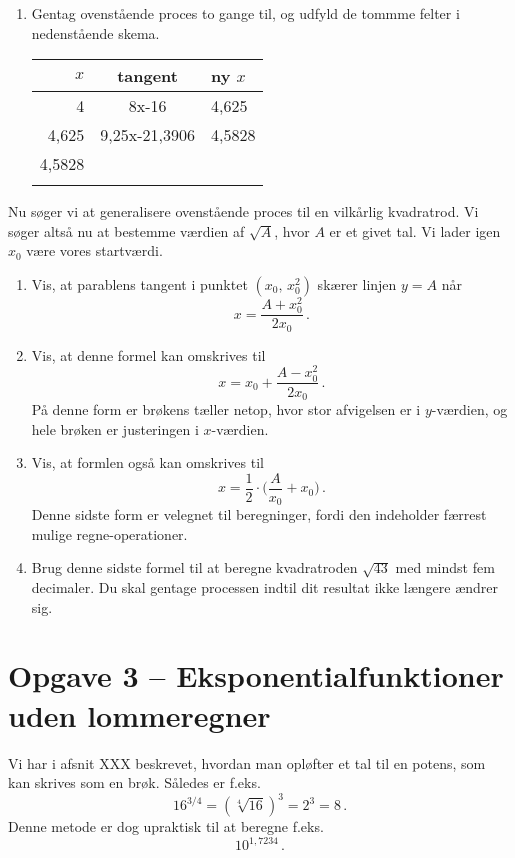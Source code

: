 \documentclass[12pt,oneside,a4paper]{article}
\theoremstyle{plain}
\begin{document}
\begin{enumerate}[label=(\alph*), resume]
    \item Gentag ovenstående proces to gange til, og udfyld de tommme felter i
        nedenstående skema.
        \begin{center}
            \begin{tabular}{|r|c|l|}
\hline
                $x$ & tangent & ny $x$ \\
                \hline
                4 & 8x-16 & 4,625 \\
                \hline
                4,625 & 9,25x-21,3906 & 4,5828 \\
                \hline
                4,5828 & & \\
                \hline
                 & & \\
                \hline
            \end{tabular}
        \end{center}
\end{enumerate}

Nu søger vi at generalisere ovenstående proces til en vilkårlig 
kvadratrod. Vi søger altså nu at bestemme værdien af $\sqrt{A}$, hvor
$A$ er et givet tal. Vi lader igen $x_0$ være vores startværdi.

\begin{enumerate}[label=(\alph*), resume]
    \item Vis, at parablens tangent i punktet $(x_0,\,x_0^2)$ 
        skærer linjen $y=A$ når
        \[
            x = \frac{A+x_0^2}{2x_0}\,.
        \]
    \item Vis, at denne formel kan omskrives til 
        \[
            x = x_0 + \frac{A-x_0^2}{2x_0}\,.
        \]
    På denne form er brøkens tæller netop, hvor stor afvigelsen er i $y$-værdien,
        og hele brøken er justeringen i $x$-værdien.
    \item Vis, at formlen også kan omskrives til
        \[
            x = \frac12 \cdot \Big(\frac{A}{x_0} + x_0\Big) \,.
        \]
    Denne sidste form er velegnet til beregninger, fordi den indeholder færrest
        mulige regne-operationer.

    \item Brug denne sidste formel til at beregne kvadratroden $\sqrt{43}$ med
        mindst fem decimaler. Du skal gentage processen indtil dit resultat
        ikke længere ændrer sig.
\end{enumerate}


\section*{Opgave 3 -- Eksponentialfunktioner uden lommeregner}
Vi har i afsnit XXX beskrevet, hvordan man opløfter et tal til en potens, som
kan skrives som en brøk. Således er f.eks.
\[
    16^{3/4} = (\sqrt[4]{16})^3 = 2^3 = 8 \,.
\]
Denne metode er dog upraktisk til at beregne f.eks.
\[
    10^{1,7234} \,.
\]
\end{document}

